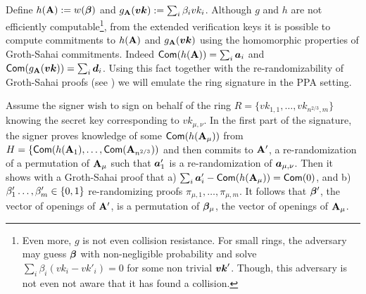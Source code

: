 Define $h(\mathbf{{A}}):=w({\boldsymbol{\beta}})$ and $g_{\mathbf{{A}}}({\boldsymbol{vk}}) := \sum_i \beta_i vk_i$.
Although $g$ and $h$ are not efficiently computable\footnote{Even more, $g$ is not even collision resistance. For small rings, the adversary may guess ${\boldsymbol{\beta}}$ with non-negligible probability and solve $\sum_i\beta_i(vk_i-vk'_i)=0$ for some non trivial ${\boldsymbol{vk}}'$. Though, this adversary is not even not aware that it has found a collision.}, from the extended verification keys it is possible to compute commitments to $h(\mathbf{{A}})$ and $g_{\mathbf{{A}}}({\boldsymbol{vk}})$ using the homomorphic properties of Groth-Sahai commitments. Indeed $\mathsf{Com}(h(\mathbf{{A}})) = \sum_i {\boldsymbol{a}}_i$ and $\mathsf{Com}(g_{\mathbf{{A}}}({\boldsymbol{vk}})) = \sum_i {\boldsymbol{d}}_i$. Using this fact together with the re-randomizability of Groth-Sahai proofs (see \cite{C:BCCKLS09}) we will emulate the ring signature in the PPA setting.

Assume the signer wish to sign on behalf of the ring $R=\{vk_{1,1},\ldots,vk_{n^{2/3},m}\}$ knowing the secret key corresponding to $vk_{\mu,\nu}$.
In the first part of the signature, the signer proves knowledge of some $\mathsf{Com}(h(\mathbf{{A}}_\mu))$ from $H = \{\mathsf{Com}(h(\mathbf{{A}}_1),\ldots,\allowbreak\mathsf{Com}(\mathbf{{A}}_{n^{2/3}}))$ and then commits to $\mathbf{{A}}'$, a re-ran\-do\-mi\-za\-tion of a permutation of $\mathbf{{A}}_\mu$ such that ${\boldsymbol{a}}'_1$ is a re-randomization of ${\boldsymbol{a}}_{\mu,\nu}$. Then it shows with a Groth-Sahai proof that a) $\sum_i {\boldsymbol{a}}'_i - \mathsf{Com}(h(\mathbf{{A}}_\mu)) = \mathsf{Com}(0)$, and b) $\beta'_1\ldots,\beta'_m\in\{0,1\}$ re-randomizing proofs $\pi_{\mu,1},\ldots,\pi_{\mu,m}$. It follows that ${\boldsymbol{\beta}}'$, the vector of openings of $\mathbf{{A}}'$, is a permutation of ${\boldsymbol{\beta}}_\mu$, the vector of openings of $\mathbf{{A}}_\mu$.

